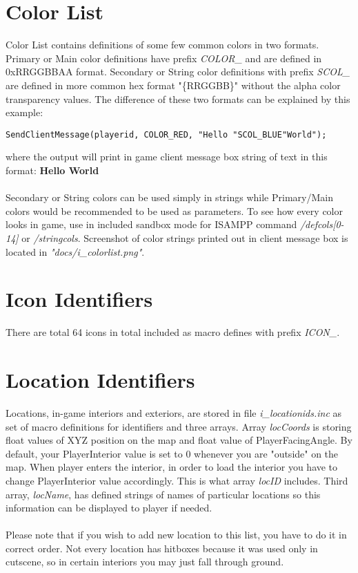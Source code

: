 \documentclass{article}
\begin{document}
\newpage
\section{Color List}
Color List contains definitions of some few common colors in two formats. Primary or Main color definitions have prefix \textit{COLOR\_} and are defined in 0xRRGGBBAA format. Secondary or String color definitions with prefix \textit{SCOL\_} are defined in more common hex format "\{RRGGBB\}" without the alpha color transparency values. The difference of these two formats can be explained by this example:
\begin{verbatim}
SendClientMessage(playerid, COLOR_RED, "Hello "SCOL_BLUE"World");
\end{verbatim}
where the output will print in game client message box string of text in this format:
\textbf{\color{red}Hello \color{blue}World}\\
\\
Secondary or String colors can be used simply in strings while Primary/Main colors would be recommended to be used as parameters. To see how every color looks in game, use in included sandbox mode for ISAMPP command \textit{/defcols[0-14]} or \textit{/stringcols}. Screenshot of color strings printed out in client message box is located in \textit{"docs/i\_colorlist.png"}.


\section{Icon Identifiers}
There are total 64 icons in total included as macro defines with prefix \textit{ICON\_}. 


\section{Location Identifiers}
Locations, in-game interiors and exteriors, are stored in file \textit{i\_locationids.inc} as set of macro definitions for identifiers and three arrays. Array \textit{locCoords} is storing float values of XYZ position on the map and float value of PlayerFacingAngle. By default, your PlayerInterior value is set to 0 whenever you are "outside" on the map. When player enters the interior, in order to load the interior you have to change PlayerInterior value accordingly. This is what array \textit{locID} includes. Third array, \textit{locName}, has defined strings of names of particular locations so this information can be displayed to player if needed.\\
\\
Please note that if you wish to add new location to this list, you have to do it in correct order. Not every location has hitboxes because it was used only in cutscene, so in certain interiors you may just fall through ground.
\end{document}
